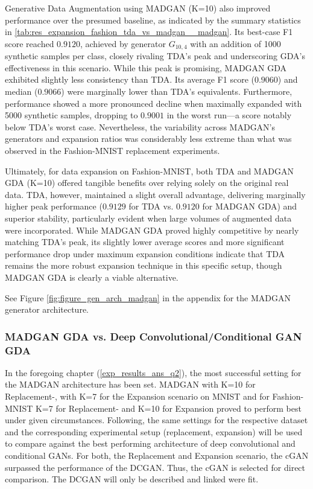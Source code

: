 Generative Data Augmentation using MADGAN (K=10) also improved performance over the presumed baseline, as indicated by the summary statistics in \ref{tab:res_expansion_fashion_tda_vs_madgan__madgan}. Its best-case F1 score reached $0.9120$, achieved by generator \(G_{10,4}\) with an addition of 1000 synthetic samples per class, closely rivaling TDA's peak and underscoring GDA's effectiveness in this scenario. While this peak is promising, MADGAN GDA exhibited slightly less consistency than TDA. Its average F1 score ($0.9060$) and median ($0.9066$) were marginally lower than TDA's equivalents. Furthermore, performance showed a more pronounced decline when maximally expanded with 5000 synthetic samples, dropping to $0.9001$ in the worst run—a score notably below TDA's worst case. Nevertheless, the variability across MADGAN's generators and expansion ratios was considerably less extreme than what was observed in the Fashion-MNIST replacement experiments.

Ultimately, for data expansion on Fashion-MNIST, both TDA and MADGAN GDA (K=10) offered tangible benefits over relying solely on the original real data. TDA, however, maintained a slight overall advantage, delivering marginally higher peak performance ($0.9129$ for TDA vs. $0.9120$ for MADGAN GDA) and superior stability, particularly evident when large volumes of augmented data were incorporated. While MADGAN GDA proved highly competitive by nearly matching TDA's peak, its slightly lower average scores and more significant performance drop under maximum expansion conditions indicate that TDA remains the more robust expansion technique in this specific setup, though MADGAN GDA is clearly a viable alternative.

See Figure \ref{fig:figure_gen_arch_madgan} in the appendix for the MADGAN generator architecture.

\newpage
\subsubsection[Question 3]{MADGAN GDA vs. Deep Convolutional/Conditional GAN GDA} \label{exp_results_ans_q3}
In the foregoing chapter (\ref{exp_results_ans_q2}), the most successful setting for the MADGAN architecture has been set. MADGAN with K=10 for Replacement-, with K=7 for the Expansion scenario on MNIST and for Fashion-MNIST K=7 for Replacement- and K=10 for Expansion proved to perform best under given circumstances. Following, the same settings for the respective dataset and the corresponding experimental setup (replacement, expansion) will be used to compare against the best performing architecture of deep convolutional and conditional GANs. For both, the Replacement and Expansion scenario, the cGAN surpassed the performance of the DCGAN. Thus, the cGAN is selected for direct comparison. The DCGAN will only be described and linked were fit.

